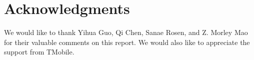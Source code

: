 \section{Acknowledgments}

We would like to thank Yihua Guo, Qi Chen, Sanae Rosen, and Z. Morley Mao for their valuable comments on this report. We would also like to appreciate the support from TMobile.

\label{sec:ack}



